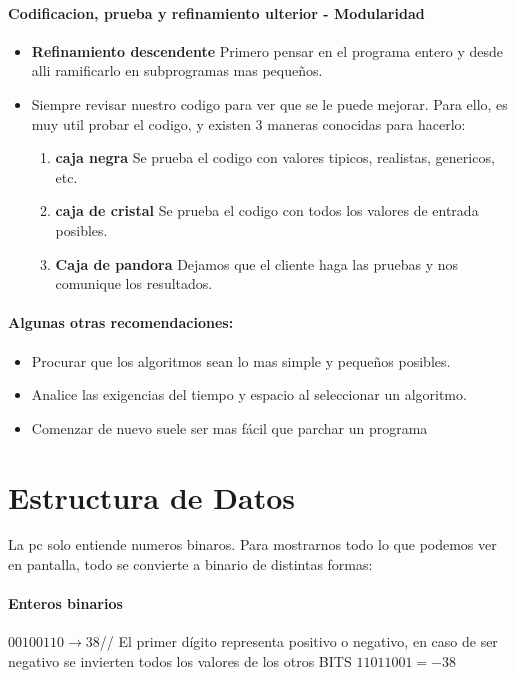 \documentclass[10pt]{article}
\begin{document}
\paragraph{Codificacion, prueba y refinamiento ulterior - Modularidad}
\begin{itemize}
	\item \textbf{Refinamiento descendente} Primero pensar en el programa entero y desde alli ramificarlo en subprogramas mas 		pequeños.
	\item Siempre revisar nuestro codigo para ver que se le puede mejorar. Para ello, es muy util probar el codigo, y existen 3 maneras conocidas para hacerlo:
	\begin{enumerate}
		\item \textbf{caja negra} Se prueba el codigo con valores tipicos, realistas, genericos, etc.
		\item  \textbf{caja de cristal} Se prueba el codigo con todos los valores de entrada posibles.
		\item \textbf{Caja de pandora} Dejamos que el cliente haga las pruebas y nos comunique los resultados.
	\end{enumerate}
\end{itemize}

\paragraph{Algunas otras recomendaciones:}

\begin{itemize}
	\item Procurar que los algoritmos sean lo mas simple y pequeños posibles.
	\item Analice las exigencias del tiempo y espacio al seleccionar un algoritmo.
	\item Comenzar de nuevo suele ser mas fácil que parchar un programa
\end{itemize}

\section{Estructura de Datos}
La pc solo entiende numeros binaros. Para mostrarnos todo lo que podemos ver en pantalla, todo se convierte a binario de distintas formas:
\paragraph{Enteros binarios}
$00100110 \rightarrow 38$//
\linebreak
El primer dígito representa positivo o negativo, en caso de ser
negativo se invierten todos los valores de los otros BITS
$11011001 = -38$
\end{document}
